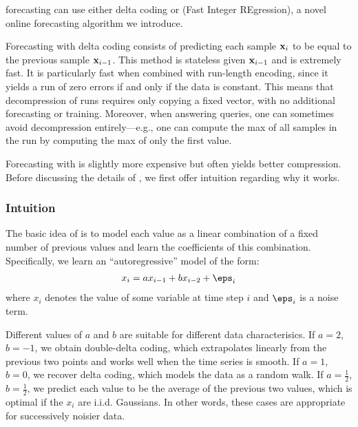 \minesp forecasting can use either delta coding or \fire (Fast Integer REgression), a novel online forecasting algorithm we introduce.

Forecasting with delta coding consists of predicting each sample $\mathbf{x}_i$ to be equal to the previous sample $\mathbf{x}_{i-1}$. This method is stateless given $\mathbf{x}_{i-1}$ and is extremely fast. It is particularly fast when combined with run-length encoding, since it yields a run of zero errors if and only if the data is constant. This means that decompression of runs requires only copying a fixed vector, with no additional forecasting or training. Moreover, when answering queries, one can sometimes avoid decompression entirely---e.g., one can compute the max of all samples in the run by computing the max of only the first value.

Forecasting with \fire is slightly more expensive but often yields better compression. Before discussing the details of \fire, we first offer intuition regarding why it works.


\subsubsection{Intuition}
The basic idea of \fire is to model each value as a linear combination of a fixed number of previous values and learn the coefficients of this combination. Specifically, we learn an ``autoregressive'' model of the form:
\begin{align}
    x_i = a x_{i-1} + b x_{i-2} + \eps_i
\end{align}
where $x_i$ denotes the value of some variable at time step $i$ and $\eps_i$ is a noise term.

Different values of $a$ and $b$ are suitable for different data characterisics. If $a = 2$, $b = -1$, we obtain double-delta coding, which extrapolates linearly from the previous two points and works well when the time series is smooth. If $a = 1$, $b = 0$, we recover delta coding, which models the data as a random walk. If $a = \frac{1}{2}$, $b = \frac{1}{2}$, we predict each value to be the average of the previous two values, which is optimal if the $x_i$ are i.i.d. Gaussians. In other words, these cases are appropriate for successively noisier data.

